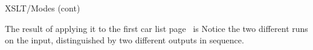 %
\begin{frame}{XSLT/Modes (cont)}

The result of applying it to the first car list page~\pageref{cars} is
 Notice the two different runs on the
input, distinguished by two different outputs in sequence.

\end{frame}
